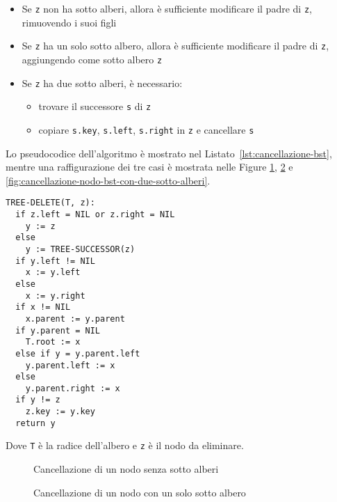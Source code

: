 \documentclass[italian, 10pt]{article}
\begin{document}
\begin{itemize}
  \item Se \texttt{z} non ha sotto alberi, allora è sufficiente modificare il padre di \texttt{z}, rimuovendo i suoi figli
  \item Se \texttt{z} ha un solo sotto albero, allora è sufficiente modificare il padre di \texttt{z}, aggiungendo come sotto albero \texttt{z}
  \item Se \texttt{z} ha due sotto alberi, è necessario:
        \begin{itemize}
          \item trovare il successore \texttt{s} di \texttt{z}
          \item copiare \texttt{s.key}, \texttt{s.left}, \texttt{s.right} in \texttt{z} e cancellare \texttt{s}
        \end{itemize}
\end{itemize}

Lo pseudocodice dell'algoritmo è mostrato nel Listato~\ref{lst:cancellazione-bst}, mentre una raffigurazione dei tre casi è mostrata nelle Figure \ref{fig:cancellazione-nodo-bst-senza-sotto-alberi}, \ref{fig:cancellazione-nodo-bst-con-un-solo-sotto-albero} e \ref{fig:cancellazione-nodo-bst-con-due-sotto-alberi}.

\begin{lstlisting}[float, style=pseudocode, caption={Cancellazione di un nodo}, label={lst:cancellazione-bst}]
TREE-DELETE(T, z):
  if z.left = NIL or z.right = NIL
    y := z
  else
    y := TREE-SUCCESSOR(z)
  if y.left != NIL
    x := y.left
  else
    x := y.right
  if x != NIL
    x.parent := y.parent
  if y.parent = NIL
    T.root := x
  else if y = y.parent.left
    y.parent.left := x
  else
    y.parent.right := x
  if y != z
    z.key := y.key
  return y
\end{lstlisting}

Dove \texttt{T} è la radice dell'albero e \texttt{z} è il nodo da eliminare.

\begin{figure}[htbp]
  \bigskip
  \centering
  \caption{Cancellazione di un nodo senza sotto alberi}
  \label{fig:cancellazione-nodo-bst-senza-sotto-alberi}
  \bigskip
\end{figure}

\begin{figure}[htbp]
  \bigskip
  \centering
  \caption{Cancellazione di un nodo con un solo sotto albero}
  \label{fig:cancellazione-nodo-bst-con-un-solo-sotto-albero}
  \bigskip
\end{figure}
\end{document}
